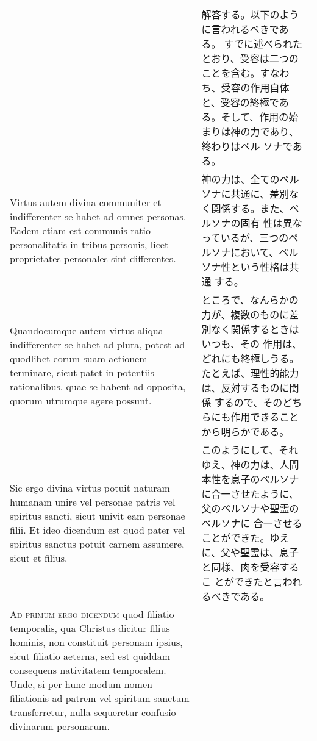 \documentclass[10pt]{jsarticle} %
\begin{document}
\begin{longtable}{p{21em}p{21em}}
&

解答する。以下のように言われるべきである。
すでに述べられたとおり、受容は二つのことを含む。すなわち、受容の作用自体
 と、受容の終極である。そして、作用の始まりは神の力であり、終わりはペル
 ソナである。


\\

Virtus autem
divina communiter et indifferenter se habet ad omnes personas. Eadem
etiam est communis ratio personalitatis in tribus personis, licet
proprietates personales sint differentes. 


&


神の力は、全てのペルソナに共通に、差別なく関係する。また、ペルソナの固有
 性は異なっているが、三つのペルソナにおいて、ペルソナ性という性格は共通
 する。

\\

Quandocumque autem virtus
aliqua indifferenter se habet ad plura, potest ad quodlibet eorum suam
actionem terminare, sicut patet in potentiis rationalibus, quae se
habent ad opposita, quorum utrumque agere possunt. 


&

ところで、なんらかの力が、複数のものに差別なく関係するときはいつも、その
 作用は、どれにも終極しうる。たとえば、理性的能力は、反対するものに関係
 するので、そのどちらにも作用できることから明らかである。

\\

Sic ergo divina
virtus potuit naturam humanam unire vel personae patris vel spiritus
sancti, sicut univit eam personae filii. Et ideo dicendum est quod pater
vel spiritus sanctus potuit carnem assumere, sicut et filius.


&

このようにして、それゆえ、神の力は、人間本性を息子のペルソナに合一させたように、父のペルソナや聖霊のペルソナに
 合一させることができた。ゆえに、父や聖霊は、息子と同様、肉を受容するこ
 とができたと言われるべきである。

\\



{\scshape Ad primum ergo dicendum} quod filiatio temporalis, qua Christus dicitur
filius hominis, non constituit personam ipsius, sicut filiatio aeterna,
sed est quiddam consequens nativitatem temporalem. Unde, si per hunc
modum nomen filiationis ad patrem vel spiritum sanctum transferretur,
nulla sequeretur confusio divinarum personarum.



\end{longtable}
\end{document}
